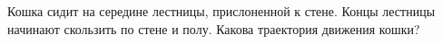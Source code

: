 \begin{ex}
	\begin{condition}
		Кошка сидит на середине лестницы, прислоненной к стене. Концы лестницы начинают скользить по стене и полу. Какова траектория движения кошки?
	\end{condition}
\end{ex}